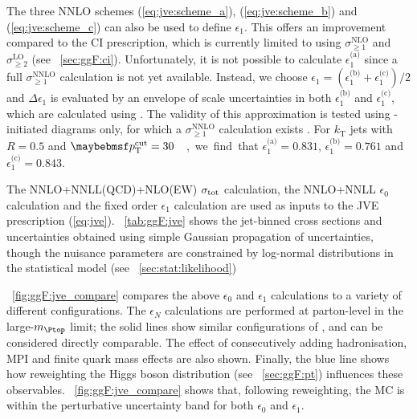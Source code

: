 The three NNLO schemes (\ref{eq:jve:scheme_a}), (\ref{eq:jve:scheme_b}) and 
(\ref{eq:jve:scheme_c}) can also be used to define $\epsilon_1$. This offers an improvement 
compared to the CI prescription, which is currently limited to using 
$\sigma_{\geq1}^{\text{NLO}}$ and $\sigma_{\geq2}^{\text{LO}}$ (see 
\Section~\ref{sec:ggF:ci}). Unfortunately, it is not possible to calculate 
$\epsilon_1^{\text{(a)}}$ since a full $\sigma_{\geq1}^{\text{NNLO}}$ calculation is not 
yet available. Instead, we choose $\epsilon_1 = (\epsilon_1^{\text{(b)}} + 
\epsilon_1^{\text{(c)}})/2$ and $\Delta\epsilon_1$ is evaluated by an envelope of scale 
uncertainties in both $\epsilon_1^{\text{(b)}}$ and $\epsilon_1^{\text{(c)}}$, which are 
calculated using \mcfm \cite{MCFM:H2j}.
The validity of this approximation is tested using \HepProcess{\Pgluon\Pgluon}-initiated 
diagrams only, for which a $\sigma_{\geq1}^{\text{NNLO}}$ calculation exists 
\cite{H+1j:NNLO}. For $k_{\text{T}}$ jets with $R = 0.5$ and \unit{$\ptcut = 30$}{\GeV}, we 
find that $\epsilon_1^{\text{(a)}} = 0.831$, $\epsilon_1^{\text{(b)}} = 0.761$ and 
$\epsilon_1^{\text{(c)}} = 0.843$.

The NNLO+NNLL(QCD)+NLO(EW) $\sigma_{\text{tot}}$ calculation, the \jetvheto NNLO+NNLL 
$\epsilon_0$ calculation and the \mcfm fixed order $\epsilon_1$ calculation are used as inputs to the JVE 
prescription (\ref{eq:jve}). \Table~\ref{tab:ggF:jve} shows the jet-binned cross sections 
and uncertainties obtained using simple Gaussian propagation of uncertainties, though the 
nuisance parameters are constrained by log-normal distributions in the statistical model 
(see \Section~\ref{sec:stat:likelihood})

\Figure~\ref{fig:ggF:jve_compare} compares the above $\epsilon_0$ and $\epsilon_1$ 
calculations to a variety of different  configurations.
The $\epsilon_N$ calculations are performed at parton-level in the large-$m_{\Ptop}$ 
limit; the solid lines show similar configurations of , 
and can be considered directly comparable. The effect of consecutively adding 
hadronisation, MPI and finite quark mass effects are also shown. Finally, the blue line 
shows how reweighting the Higgs boson \pt distribution (see \Section~\ref{sec:ggF:pt}) 
influences these observables. \Figure~\ref{fig:ggF:jve_compare} shows that, following 
\ptH reweighting, the MC is within the perturbative uncertainty band for both $\epsilon_0$ 
and $\epsilon_1$.

